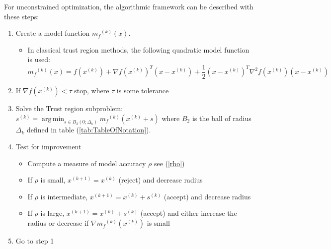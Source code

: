 \documentclass{article}
\theoremstyle{case}
\newcommand{\modelk}{{{m}_f}^{(k)}}
\newcommand{\iteratek}{{x}^{(k)}}
\newcommand{\trialk}{{s}^{(k)}}
\newcommand{\iteratekpone}{{x}^{(k+1)}}
\DeclareMathOperator*{\argmin}{arg\,min}
\let\oldref\ref
\renewcommand{\ref}[1]{(\oldref{#1})}
\begin{document}
For unconstrained optimization, the algorithmic framework can be described with these steps:

\begin{enumerate}
	\item Create a model function $\modelk(x)$.
	\begin {itemize}
		\item In classical trust region methods, the following quadratic model function is used:
		\[
		\modelk(x) = f(\iteratek) + \nabla f(\iteratek)^T (x-\iteratek) + \frac 1 2 (x-\iteratek)^T\nabla^2f(\iteratek)(x-\iteratek)
		\]
	\end{itemize}
	
	\item If $\nabla f(\iteratek) < \tau$ stop, where $\tau$ is some tolerance
	
	\item Solve the Trust region subproblem: $s^{(k)} = \argmin_{s\in B_2(0; \Delta_k)} \modelk (\iteratek + s)$ where $B_2$ is the ball of radius $\Delta_k$ defined in table \ref{tab:TableOfNotation}.
	
	\item Test for improvement
	\begin{itemize}
		\item Compute a measure of model accuracy $\rho$ see \ref{rho}
		\item If $\rho$ is small, $\iteratekpone=\iteratek$ (reject) and decrease radius
		\item If $\rho$ is intermediate, $\iteratekpone=\iteratek+\trialk$ (accept) and decrease radius
		\item If $\rho$ is large, $\iteratekpone=\iteratek+\trialk$ (accept) and either increase the radius or decrease if $\nabla \modelk(\iteratek)$ is small
	\end{itemize}
	
	\item Go to step 1
\end{enumerate}
\end{document}

